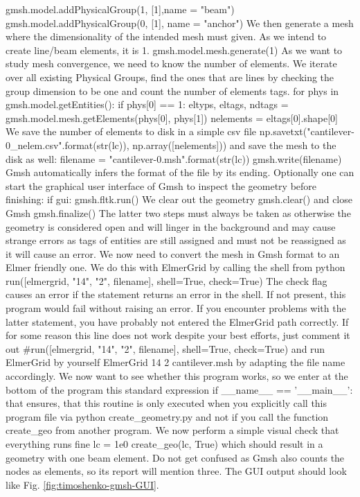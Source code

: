 \ttbegin
gmsh.model.addPhysicalGroup(1, [1],name = "beam")
\ttend  
\ttbegin  
gmsh.model.addPhysicalGroup(0, [1], name = "anchor")
\ttend
We then generate a mesh where the dimensionality of the intended mesh must given. As we intend to create line/beam elements, it is 1.
\ttbegin
gmsh.model.mesh.generate(1)
\ttend
As we want to study mesh convergence, we need to know the number of elements. We iterate over all existing Physical Groups, find the ones that are lines by checking the group dimension to be one and count the number of elements tags.
\ttbegin
for phys in gmsh.model.getEntities():
   if phys[0] == 1:
      eltyps, eltags, ndtags = gmsh.model.mesh.getElements(phys[0], 
                                                           phys[1]) 
      nelements = eltags[0].shape[0]
\ttend
We save the number of elements to disk in a simple csv file
\ttbegin
np.savetxt("cantilever-{0}_nelem.csv".format(str(lc)), np.array([nelements]))
\ttend
and save the mesh to the disk as well: 
\ttbegin
filename = "cantilever-{0}.msh".format(str(lc))
gmsh.write(filename)
\ttend
Gmsh automatically infers the format of the file by its ending. Optionally one can start the graphical user interface of Gmsh to inspect the geometry before finishing:
\ttbegin
if gui:
   gmsh.fltk.run()
\ttend 
We clear out the geometry
\ttbegin
gmsh.clear()
\ttend 
and close Gmsh
\ttbegin
gmsh.finalize()
\ttend 
The latter two steps must always be taken as otherwise the geometry is considered open and will linger in the background and may cause strange errors as tags of entities are still assigned and must not be reassigned as it will cause an error. We now need to convert the mesh in Gmsh format to an Elmer friendly one. We do this with ElmerGrid by calling the shell from python
\ttbegin
run([elmergrid, "14", "2", filename], shell=True, check=True)
\ttend
The check flag causes an error if the statement returns an error in the shell. If not present, this program would fail without raising an error. If you encounter problems with the latter statement, you have probably not entered the ElmerGrid path correctly. If for some reason this line does not work despite your best efforts, just comment it out
\ttbegin
#run([elmergrid, "14", "2", filename], shell=True, check=True)
\ttend
and run ElmerGrid by yourself 
\ttbegin
ElmerGrid 14 2 cantilever.msh
\ttend
by adapting the file name accordingly. We now want to see whether this program works, so we enter at the bottom of the program this standard expression
\ttbegin
if __name__ == '__main__':
\ttend 
that ensures, that this routine is only executed when you explicitly call this program file via
\ttbegin
python create_geometry.py
\ttend
and not if you call the function create\_geo from another program. We now perform a simple visual check that everything runs fine
\ttbegin
   lc = 1e0
   create_geo(lc, True)
\ttend
which should result in a geometry with one beam element. Do not get confused as Gmsh also counts the nodes as elements, so its report will mention three. The GUI output should look like Fig. \ref{fig:timoshenko-gmsh-GUI}. 

